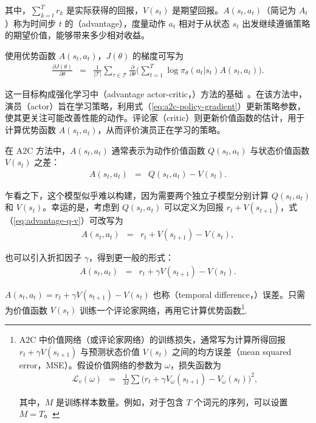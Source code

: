 \noindent 其中，$\sum_{k=t}^{T} r_k $ 是实际获得的回报，$V(s_t)$ 是期望回报。$A(s_t,a_t)$（简记为 $A_t$）称为时间步 $t$ 的（advantage），度量动作 $a_t$ 相对于从状态 $s_t$ 出发继续遵循策略的期望价值，能够带来多少相对收益。

使用优势函数 $A(s_t,a_t)$，$J(\theta)$ 的梯度可写为
\begin{eqnarray}
\frac{\partial J(\theta)}{\partial \theta} & = & \frac{1}{|\mathcal{T}|} \sum_{\tau \in \mathcal{T}} \frac{\partial}{\partial \theta} \Big( \sum_{t=1}^{T} \log \pi_{\theta}(a_t|s_t) A(s_t,a_t) \Big). \label{eq:a2c-policy-gradient}
\end{eqnarray}

这一目标构成强化学习中（advantage actor-critic，）方法的基础~\cite{mnih-etal:2016asynchronous}。在该方法中，演员（actor）旨在学习策略，利用式（\ref{eq:a2c-policy-gradient}）更新策略参数，使其更关注可能改善性能的动作。评论家（critic）则更新价值函数的估计，用于计算优势函数 $A(s_t,a_t)$，从而评价演员正在学习的策略。

在 A2C 方法中，$A(s_t,a_t)$ 通常表示为动作价值函数 $Q(s_t,a_t)$ 与状态价值函数 $V(s_t)$ 之差：
\begin{eqnarray}
A(s_t,a_t) & = & Q(s_t,a_t) - V(s_t). \label{eq:advantage-q-v}
\end{eqnarray}

\noindent 乍看之下，这个模型似乎难以构建，因为需要两个独立子模型分别计算 $Q(s_t,a_t)$ 和 $V(s_t)$。幸运的是，考虑到 $Q(s_t,a_t)$ 可以定义为回报 $r_t + V(s_{t+1})$，式（\ref{eq:advantage-q-v}）可改写为
\begin{eqnarray}
A(s_t,a_t) & = & r_t + V(s_{t+1}) - V(s_t),
\end{eqnarray}

\noindent 也可以引入折扣因子 $\gamma$，得到更一般的形式：
\begin{eqnarray}
A(s_t,a_t) & = & r_t + \gamma V(s_{t+1}) - V(s_t).
\end{eqnarray}

\noindent $A(s_t,a_t) = r_t + \gamma V(s_{t+1}) - V(s_t)$ 也称（temporal difference，）误差。只需为价值函数 $V(s_t)$ 训练一个评论家网络，再用它计算优势函数\footnote{A2C 中价值网络（或评论家网络）的训练损失，通常写为计算所得回报 $r_t + \gamma V(s_{t+1})$ 与预测状态价值 $V(s_t)$ 之间的均方误差（mean squared error，MSE）。假设价值网络的参数为 $\omega$，损失函数为
\begin{eqnarray}
\mathcal{L}_v(\omega) & = & \frac{1}{M} \sum \big(r_t + \gamma V_{\omega}(s_{t+1}) - V_{\omega}(s_t) \big)^2,
\end{eqnarray}

\noindent 其中，$M$ 是训练样本数量。例如，对于包含 $T$ 个词元的序列，可以设置 $M=T$。
}.

